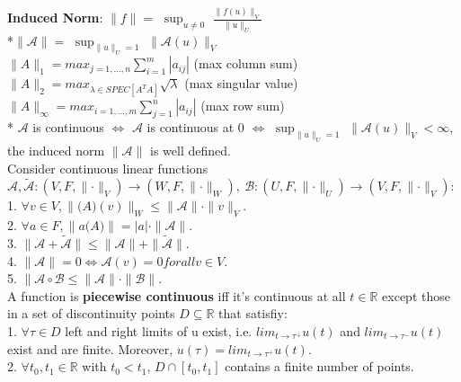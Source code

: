 \documentclass[10pt,landscape]{article}
\begin{document}
\begin{multicols*}{4}
\textbf{Induced Norm}: $\parallel f \parallel = $ \(\sup_{u \neq 0}\) $ \frac {\parallel f(u) \parallel_V}{\parallel u \parallel_U}$\\
*$\parallel \mathcal{A} \parallel = $ \(\sup_{\parallel u \parallel_U = 1}\) $ \parallel \mathcal{A}(u) \parallel_V$\\
$\parallel A \parallel_1 = max_{j = 1,...,n} \sum_{i=1}^{m} |a_{ij}| $ (max column sum)
$\parallel A \parallel_2 = max_{\lambda \in SPEC[A^T A]} \sqrt{\lambda}$ (max singular value)
$\parallel A \parallel_\infty = max_{i = 1,...,m} \sum_{j=1}^{n} |a_{ij}| $ (max row sum)\\

* $\mathcal{A}$ is continuous $\Leftrightarrow $ $\mathcal{A}$ is continuous at 0 $\Leftrightarrow$
  \(\sup_{\parallel u \parallel_U = 1}\) $ \parallel \mathcal{A}(u) \parallel_V < \infty$, the induced norm $\parallel \mathcal{A} \parallel$ is well defined.\\
Consider continuous linear functions $\mathcal{A}, \tilde{\mathcal{A}}: (V,F,\parallel \cdot \parallel_V) \rightarrow (W,F,\parallel \cdot \parallel_W),\ \mathcal{B}: (U,F,\parallel \cdot \parallel_U) \rightarrow (V,F,\parallel \cdot \parallel_V)$:\\
1. $\forall v \in V, \parallel \mathcal(A)(v) \parallel_W \leq \parallel \mathcal{A} \parallel \cdot \parallel v \parallel_V$.\\
2. $\forall a \in F, \parallel a \mathcal(A) \parallel = |a| \cdot \parallel \mathcal{A} \parallel$.\\
3. $\parallel \mathcal{A} + \tilde{\mathcal{A}} \parallel \leq \parallel \mathcal{A} \parallel + \parallel \tilde{\mathcal{A}} \parallel$.\\
4. $\parallel \mathcal{A} \parallel = 0 \Leftrightarrow \mathcal{A}(v)=0 for all v \in V$.\\
5. $\parallel \mathcal{A} \circ \mathcal{B} \leq \parallel \mathcal{A} \parallel \cdot \parallel \mathcal{B} \parallel$.\\

A function is \textbf{piecewise continuous} iff it's continuous at all $t \in \mathbb{R}$ except those in a set of discontinuity points $D \subseteq \mathbb{R}$ that satisfiy:\\
1. $\forall \tau \in D$ left and right limits of u exist, i.e. $lim_{t\rightarrow \tau^+} u(t)$ and $lim_{t\rightarrow \tau^-} u(t)$ exist and are finite. Moreover, $u(\tau) = lim_{t\rightarrow \tau^+} u(t)$.\\
2. $\forall t_0,t_1 \in \mathbb{R}$ with $t_0<t_1$, $D\cap [t_0, t_1]$ contains a finite number of points.\\


\end{multicols*}
\end{document}
